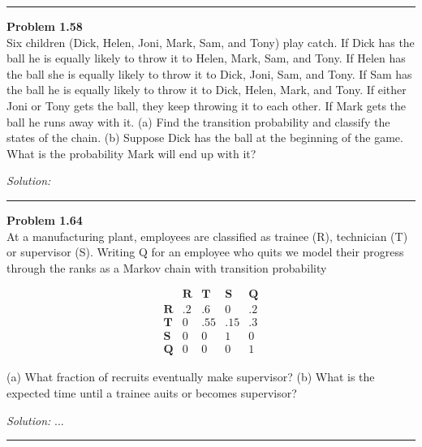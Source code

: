 \documentclass[a4paper, 11pt]{article}
\newenvironment{problem}[2][Problem]
    { \begin{mdframed}[backgroundcolor=gray!20] \textbf{#1 #2} \\}
    {  \end{mdframed}}
\newenvironment{solution}
    {\textit{Solution:}}
    {}
\begin{document}
\noindent\rule{7in}{2.8pt}

\begin{problem}{1.58}
Six children (Dick, Helen, Joni, Mark, Sam, and Tony) play catch. If Dick has the ball he is equally likely to throw it to Helen, Mark, Sam, and Tony. If Helen has the ball she is equally likely to throw it to Dick, Joni, Sam, and Tony. If Sam has the ball he is equally likely to throw it to Dick, Helen, Mark, and Tony. If either Joni or Tony gets the ball, they keep throwing it to each other. If Mark gets the ball he runs away with it. (a) Find the transition probability and classify the states of the chain. (b) Suppose Dick has the ball at the beginning of the game. What is the probability Mark will end up with it?

\end{problem}
\begin{solution}


\end{solution} 

\noindent\rule{7in}{2.8pt}

\begin{problem}{1.64}
At a manufacturing plant, employees are classified as trainee (R), technician (T) or supervisor (S). Writing Q for an employee who quits we model their progress through the ranks as a Markov chain with transition probability

$$\begin{array}{lllll} 
\ & \mathbf{R} & \mathbf{T} & \mathbf{S} & \mathbf{Q} \\
\mathbf{R} & .2 & .6 & 0 & .2 \\
\mathbf{T} & 0 & .55 & .15 & .3 \\
\mathbf{S} & 0 & 0 & 1 & 0 \\
\mathbf{Q} & 0 & 0 & 0 & 1
\end{array}$$

(a) What fraction of recruits eventually make supervisor? (b) What is the expected time until a trainee auits or becomes supervisor?
\end{problem}
\begin{solution}
...
\end{solution} 

\noindent\rule{7in}{2.8pt}
\end{document}
